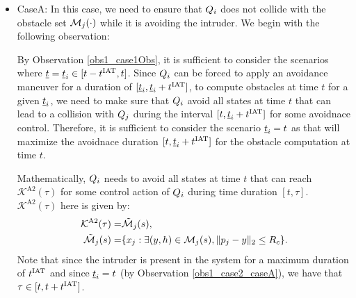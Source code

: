\begin{itemize}[leftmargin=*] 
\item \label{sec:intruderObs_case2_caseA} CaseA: In this case, we need to ensure that $Q_i$ does not collide with the obstacle set $\mathcal{M}_j(\cdot)$ while it is avoiding the intruder. We begin with the following observation: 
\begin{observation} \label{obs1_case2_caseA}
By Observation \ref{obs1_case1Obs}, it is sufficient to consider the scenarios where $\underline{t} = \underline{t}_i \in [t-t^\text{IAT}, t]$. Since $Q_i$ can be forced to apply an avoidance maneuver for a duration of $[\underline{t}_i, \underline{t}_i+t^\text{IAT}]$, to compute obstacles at time $t$ for a given $\underline{t}_i$, we need to make sure that $Q_i$ avoid all states at time $t$ that can lead to a collision with $Q_j$ during the interval $[t, \underline{t}_i+t^\text{IAT}]$ for some avoidnace control. Therefore, it is sufficient to consider the scenario $\underline{t}_i = t$ as that will maximize the avoidnace duration $[t, \underline{t}_i+t^\text{IAT}]$ for the obstacle computation at time $t$.  
\end{observation}

Mathematically, $Q_i$ needs to avoid all states at time $t$ that can reach $\mathcal{K}^{\text{A2}}(\tau)$ for some control action of $Q_i$ during time duration $[t, \tau]$. $\mathcal{K}^{\text{A2}}(\tau)$ here is given by:
\begin{equation}
\begin{aligned}
\mathcal{K}^{\text{A2}}(\tau) = & \tilde{\mathcal{M}}_j(s),\\
\tilde{\mathcal{M}}_j(s) = & \{x_j: \exists (y, h) \in \mathcal{M}_j(s), \|p_j - y\|_2 \le R_c \}.
\end{aligned}
\end{equation}
Note that since the intruder is present in the system for a maximum duration of $t^\text{IAT}$ and since $\underline{t}_i = t$ (by Observation \ref{obs1_case2_caseA}), we have that $\tau \in [t, t+t^\text{IAT}]$. 


\end{itemize}
